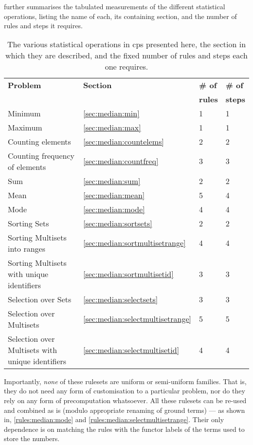 further summarises the tabulated measurements of the different statistical operations, listing the name of each, its containing section, and the number of rules and steps it requires.

\begin{table}[htbp] \centering
   \begin{tabular}{|l|l|l|l|}
    \hline
    \textbf{Problem} & \textbf{Section} & \textbf{\# of} & \textbf{\# of}\\&& \textbf{rules} & \textbf{steps}\\ \hline
    Minimum & \ref{sec:median:min} & 1 & 1 \\ %
    Maximum & \ref{sec:median:max} & 1 & 1 \\ \hline
    Counting elements & \ref{sec:median:countelems} & 2 & 2 \\ %
    Counting frequency of elements & \ref{sec:median:countfreq} & 3 & 3 \\ \hline
    Sum & \ref{sec:median:sum} & 2 & 2 \\ %
    Mean & \ref{sec:median:mean} & 5 & 4 \\ %
    Mode & \ref{sec:median:mode} & 4 & 4 \\ \hline
    Sorting Sets & \ref{sec:median:sortsets} & 2 & 2 \\ %
    Sorting Multisets into ranges & \ref{sec:median:sortmultisetrange} & 4 & 4 \\ %
    Sorting Multisets with unique identifiers & \ref{sec:median:sortmultisetid} & 3 & 3 \\ \hline
    Selection over Sets & \ref{sec:median:selectsets} & 3 & 3 \\ %
    Selection over Multisets & \ref{sec:median:selectmultisetrange} & 5 & 5 \\ %
    Selection over Multisets with unique identifiers & \ref{sec:median:selectmultisetid} & 4 & 4 \\ \hline
\end{tabular} 
\caption[Summary of statistical operations in \gls{cps}]{\label{tab:median:summary}The various statistical operations in \gls{cps} presented here, the section in which they are described, and the fixed number of rules and steps each one requires.}
\end{table}

Importantly, \emph{none} of these \glspl{ruleset} are uniform or semi-uniform families.  That is, they do not need any form of customisation to a particular problem, nor do they rely on any form of precomputation whatsoever.  All these \glspl{ruleset} can be re-used and combined as is (modulo appropriate renaming of ground terms) --- as shown in, \eg{} \cref{rules:median:mode} and \cref{rules:median:selectmultisetrange}.  Their only dependence is on matching the rules with the \gls{functor} labels of the terms used to store the numbers.

